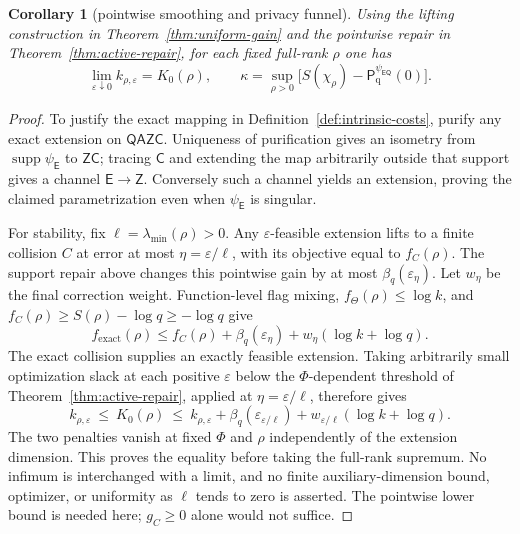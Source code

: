 \documentclass[11pt,a4paper]{article}
\numberwithin{equation}{section}
\theoremstyle{plain}
\newtheorem{corollary}[theorem]{Corollary}
\theoremstyle{definition}
\DeclareMathOperator{\supp}{supp}
\newcommand{\rg}[1]{\mathsf{#1}}
\newcommand{\Pfun}{\mathsf{P}_{\mathrm{q}}}%
\begin{document}
\begin{corollary}[pointwise smoothing and privacy funnel]
\label{cor:pointwise-funnel}
Using the lifting construction in Theorem~\ref{thm:uniform-gain} and the
pointwise repair in Theorem~\ref{thm:active-repair}, for each fixed full-rank
$\rho$ one has
\[
\lim_{\varepsilon\downarrow 0}k_{\rho,\varepsilon}=K_0(\rho),
\qquad
\kappa=\sup_{\rho>0}\bigl[S(\chi_\rho)-\Pfun^{\psi_{\rg{E}\rg{Q}}}(0)\bigr].
\]
\end{corollary}

\begin{proof}
To justify the exact mapping in Definition~\ref{def:intrinsic-costs}, purify
any exact extension on $\rg{Q}\rg{A}\rg{Z}\rg{C}$. Uniqueness of purification
gives an isometry from $\supp\psi_{\rg{E}}$ to $\rg{Z}\rg{C}$; tracing
$\rg{C}$ and extending the map arbitrarily outside that support gives a
channel $\rg{E}\to\rg{Z}$. Conversely such a channel yields an extension,
proving the claimed parametrization even when $\psi_{\rg{E}}$ is singular.

For stability, fix $\ell=\lambda_{\min}(\rho)>0$. Any $\varepsilon$-feasible
extension lifts to a finite collision $C$ at error at most
$\eta=\varepsilon/\ell$, with its objective equal to $f_C(\rho)$. The support
repair above changes this pointwise gain by at most
$\beta_q(\varepsilon_\eta)$. Let $w_\eta$ be the final correction weight.
Function-level flag mixing, $f_\Theta(\rho)\le\log k$, and
$f_C(\rho)\ge S(\rho)-\log q\ge-\log q$ give
\[
f_{\mathrm{exact}}(\rho)\le f_C(\rho)+\beta_q(\varepsilon_\eta)
+w_\eta(\log k+\log q).
\]
The exact collision supplies an exactly feasible extension. Taking arbitrarily
small optimization slack at each positive $\varepsilon$ below the
$\Phi$-dependent threshold of Theorem~\ref{thm:active-repair}, applied at
$\eta=\varepsilon/\ell$, therefore gives
\begin{equation}
\label{eq:smoothing-squeeze}
k_{\rho,\varepsilon}\ \le\ K_0(\rho)\ \le\ k_{\rho,\varepsilon}
+\beta_q(\varepsilon_{\varepsilon/\ell})
+w_{\varepsilon/\ell}(\log k+\log q).
\end{equation}
The two penalties vanish at fixed $\Phi$ and $\rho$ independently of the
extension dimension. This proves the equality before taking the full-rank
supremum. No infimum is interchanged with a limit, and no finite
auxiliary-dimension bound, optimizer, or uniformity as $\ell$ tends to zero is
asserted. The pointwise lower bound is needed here; $g_C\ge 0$ alone would not
suffice.
\end{proof}
\end{document}
